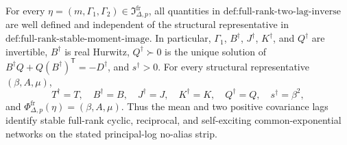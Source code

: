 For every \(\eta=(m,\Gamma_1,\Gamma_2)\in\mathfrak I_{\Delta,p}^{\mathrm{fr}}\), all quantities in \(\text{def:full-rank-two-lag-inverse}\) are well defined and independent of the structural representative in \(\text{def:full-rank-stable-moment-image}\). In particular, \(\Gamma_1\), \(B^\dagger\), \(J^\dagger\), \(K^\dagger\), and \(Q^\dagger\) are invertible, \(B^\dagger\) is real Hurwitz, \(Q^\dagger\succ0\) is the unique solution of \(B^\dagger Q+Q(B^\dagger)^{\mathsf T}=-D^\dagger\), and \(s^\dagger>0\). For every structural representative \((\beta,A,\mu)\),
\[
 T^\dagger=T,\quad B^\dagger=B,\quad J^\dagger=J,\quad K^\dagger=K,\quad Q^\dagger=Q,\quad s^\dagger=\beta^2,
\]
and \(\Phi^{\mathrm{fr}}_{\Delta,p}(\eta)=(\beta,A,\mu)\). Thus the mean and two positive covariance lags identify stable full-rank cyclic, reciprocal, and self-exciting common-exponential networks on the stated principal-log no-alias strip.